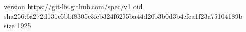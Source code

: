 version https://git-lfs.github.com/spec/v1
oid sha256:6a272d131c5bbf8305c3feb324f6295ba44d20b3b0d3b4cfca1f23a75104189b
size 1925
